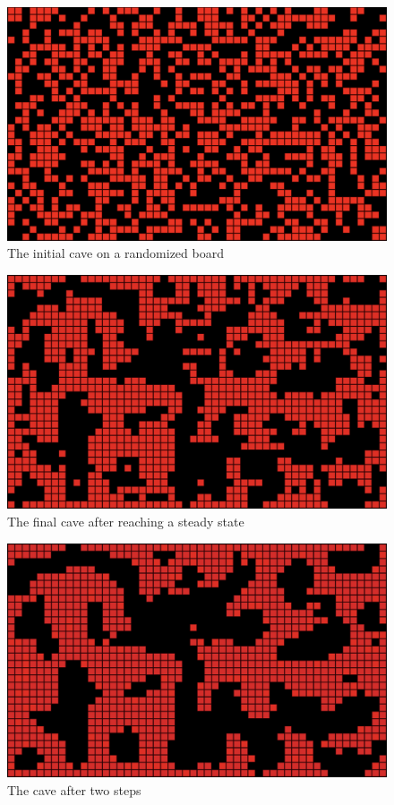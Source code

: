 \documentclass[a4paper, 12pt]{article}
\begin{document}
\begin{figure}[h]
	\centering
	\includegraphics[width=\textwidth]{initial-cave.png}
	\caption{The initial cave on a randomized board}
	\label{fig:initialCave}
\end{figure}

\begin{figure}[h]
	\centering
	\includegraphics[width=\textwidth]{one-step-cave.png}
	\caption{The final cave after reaching a steady state}
	\label{fig:oneStepCave}
\end{figure}

\begin{figure}[h]
	\centering
	\includegraphics[width=\textwidth]{two-step-cave.png}
	\caption{The cave after two steps}
	\label{fig:twoStepCave}
\end{figure}
\end{document}
